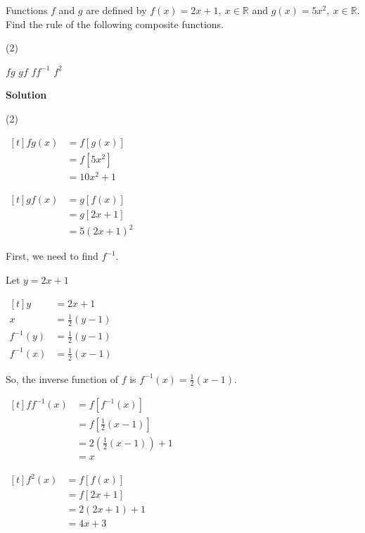 \documentclass[11pt,a4paper]{book}
\newcommand{\R}{\mathbb{R}}
\begin{document}
\begin{example}{}

Functions $f$ and $g$ are defined by $f\left(x\right)=2x+1,\:x\in\R$
and $g\left(x\right)=5x^{2},\:x\in\R$.
Find the rule of the following composite functions.

\begin{tasks}[label=(\alph*),label-width=3.5ex](2)

\task $fg$
\task $gf$
\task $ff^{-1}$
\task $f^{2}$

\end{tasks}

\textbf{Solution }

\begin{tasks}[label=(\alph*),label-width=3.5ex](2)

\task
$
\begin{aligned}[t]
fg\left(x\right) & =f\left[g\left(x\right)\right]\\
 & =f\left[5x^{2}\right]\\
 & =10x^{2}+1
\end{aligned}
$

\task
$
\begin{aligned}[t]
gf\left(x\right) & =g\left[f\left(x\right)\right]\\
 & =g\left[2x+1\right]\\
 & =5\left(2x+1\right)^{2}
\end{aligned}
$

\task First, we need to find $f^{-1}$.

Let $y=2x+1$

$
\begin{aligned}[t]
y & =2x+1\\
x & =\frac{1}{2}\left(y-1\right)\\
f^{-1}\left(y\right) & =\frac{1}{2}\left(y-1\right)\\
f^{-1}\left(x\right) & =\frac{1}{2}\left(x-1\right)
\end{aligned}
$

So, the inverse function of $f$ is ${\displaystyle f^{-1}\left(x\right)=\frac{1}{2}\left(x-1\right)}$.

$
\begin{aligned}[t]
ff^{-1}\left(x\right) & =f\left[f^{-1}\left(x\right)\right]\\
 & =f\left[\frac{1}{2}\left(x-1\right)\right]\\
 & =2\left(\frac{1}{2}\left(x-1\right)\right)+1\\
 & =x
\end{aligned}
$

\task
$
\begin{aligned}[t]
f^{2}\left(x\right) & =f\left[f\left(x\right)\right]\\
 & =f\left[2x+1\right]\\
 & =2\left(2x+1\right)+1\\
 & =4x+3
\end{aligned}
$

\end{tasks}
\end{example}
\end{document}
